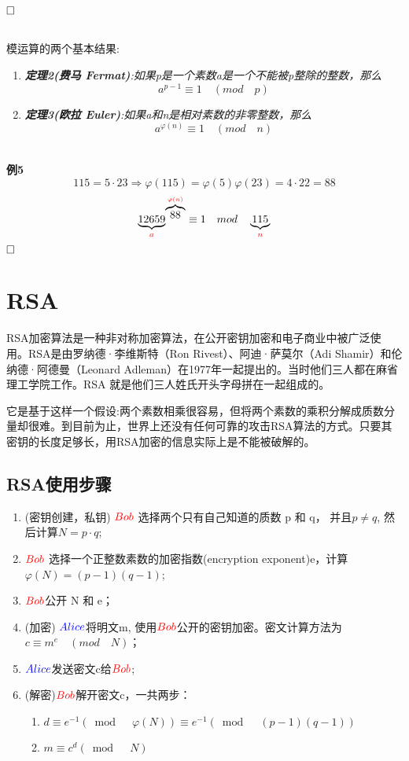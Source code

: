 \documentclass{article}
\begin{document}
$\hfill\square$ 

~\\
模运算的两个基本结果:

\begin{enumerate}
\item \textit{\textbf{定理2(费马 Fermat)}:如果p是一个素数a是一个不能被p整除的整数，那么}
$$a^{p-1} \equiv 1 \quad (mod \quad p)$$
\item \textit{\textbf{定理3(欧拉 Euler)}:如果a和n是相对素数的非零整数，那么}
$$a^{\varphi(n)} \equiv 1 \quad (mod \quad n)$$
\end{enumerate} 

~\\

\textbf{例5}
$$
115 = 5 \cdot 23  \Rightarrow \varphi(115) = \varphi(5)\varphi(23) = 4 \cdot 22 = 88
$$
$$
 {\underbrace{12659}_{{\color{red}a}}}^{ \overbrace{88}^{{\color{red}\varphi(n)}}} \equiv 1 \quad mod  \quad \underbrace{115}_{{\color{red}n}}
$$
$\hfill\square$ 

\section{RSA}

RSA加密算法是一种非对称加密算法，在公开密钥加密和电子商业中被广泛使用。RSA是由罗纳德·李维斯特（Ron Rivest）、阿迪·萨莫尔（Adi Shamir）和伦纳德·阿德曼（Leonard Adleman）在1977年一起提出的。当时他们三人都在麻省理工学院工作。RSA 就是他们三人姓氏开头字母拼在一起组成的。

它是基于这样一个假设:两个素数相乘很容易，但将两个素数的乘积分解成质数分量却很难。到目前为止，世界上还没有任何可靠的攻击RSA算法的方式。只要其密钥的长度足够长，用RSA加密的信息实际上是不能被破解的。

\subsection{RSA使用步骤}

\begin{enumerate}
\item (密钥创建，私钥) ${\color{red}Bob}$ 选择两个只有自己知道的质数 p 和 q， 并且$p \ne q$, 然后计算$N = p \cdot q$; 
\item ${\color{red}Bob}$ 选择一个正整数素数的加密指数(encryption exponent)e，计算$\varphi(N) = (p-1)(q-1)$;
\item ${\color{red}Bob}$公开 N 和 e；
\item (加密) ${\color{blue}Alice}$将明文m, 使用${\color{red}Bob}$公开的密钥加密。密文计算方法为$c \equiv m^e \quad (mod \quad N)$；
\item ${\color{blue}Alice}$发送密文c给${\color{red}Bob}$;
\item (解密)${\color{red}Bob}$解开密文c，一共两步：
\begin{enumerate}
\item $d \equiv e^{-1}(\bmod \quad \varphi(N)) \equiv e^{-1}(\bmod \quad  (p-1)(q-1))$
\item $m \equiv c^d (\bmod \quad  N)$
\end{enumerate}
\end{enumerate}
\end{document}
